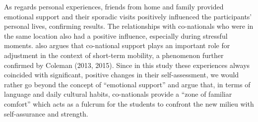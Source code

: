 \documentclass[output=paper]{langsci/langscibook}
\begin{document}
As regards personal experiences, friends from home and family provided emotional support and their sporadic visits positively influenced the participants’ personal lives, confirming  results. The relationships with co-nation\-als who were in the same location also had a positive influence, especially during stressful moments. \citet{Pitts2009} also argues that co-national support plays an important role for adjustment in the context of short-term mobility, a phenomenon further confirmed by Coleman (2013, 2015). Since in this study these experiences always coincided with significant, positive changes in their self-assessment, we would rather go beyond the concept of “emotional support” and argue that, in terms of language and daily cultural habits, co-nationals provide a “zone of familiar comfort” which acts as a fulcrum for the students to confront the new milieu with self-assurance and strength.
\end{document}
